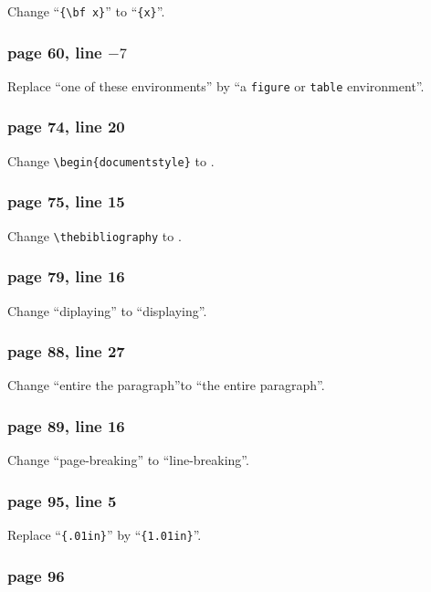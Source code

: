 Change ``\verb|{\bf x}|'' to ``\verb|{x}|''.
 
\subsubsection*{page 60, line $-7$}
 
Replace ``one of these environments'' by ``a {\tt figure} or
{\tt table} environment''.
 
\subsubsection*{page 74, line 20}
Change \verb|\begin{documentstyle}| to \verb||.
 
 
\subsubsection*{page 75, line 15}
Change \verb|\thebibliography|  to \verb||.
 
\subsubsection*{page 79, line 16}
Change ``diplaying'' to ``displaying''.
 
\subsubsection*{page 88, line 27}
 
Change ``entire the paragraph''to ``the entire paragraph''.
 
\subsubsection*{page 89, line 16}
 
Change ``page-breaking'' to ``line-breaking''.  
 
\subsubsection*{page 95, line 5}
 
Replace ``\verb|{.01in}|'' by ``\verb|{1.01in}|''.
 
\subsubsection*{page 96}
 
